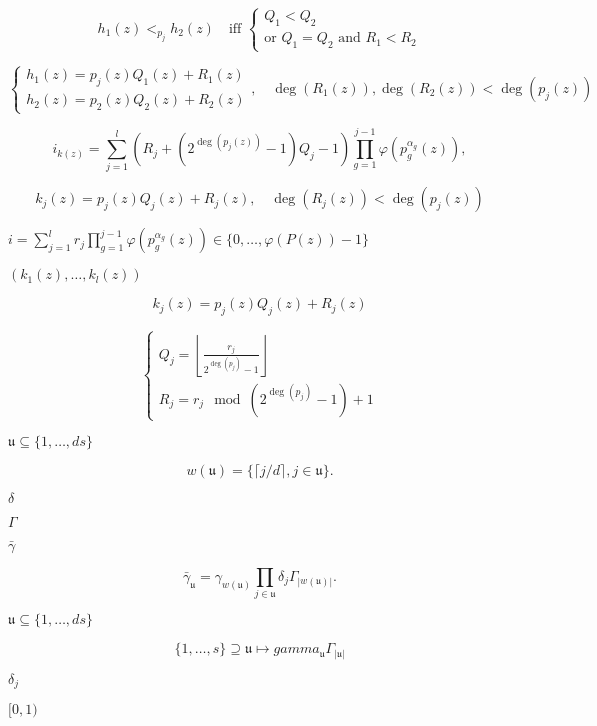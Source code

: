 \documentclass{article}
\begin{document}
\[h_{1}(z) <_{p_{j}}  h_{2}(z) \quad \text{iff } \left\{
\begin{array}{ll}
Q_1 < Q_2 \\
\text{or } Q_1 = Q_2 \text{ and } R_1 < R_2
\end{array}
\right.
\]
\pagebreak

\[\left\{
\begin{array}{ll}
h_{1}(z) = p_{j}(z) Q_{1}(z) + R_{1}(z) \\
h_{2}(z) = p_{2}(z) Q_{2}(z) + R_{2}(z)
\end{array}
\right., \quad \deg(R_{1}(z)),\deg(R_{2}(z)) < \deg(p_{j}(z))
\]
\pagebreak

\[  i_{k(z)} = \sum_{j=1}^{l} (R_{j} + (2^{\deg(p_j(z))}-1)Q_{j}-1) \prod_{g=1}^{j-1} \varphi(p_{g}^{\alpha_{g}}(z)),
\]
\pagebreak

\[  k_{j}(z) = p_{j}(z) Q_{j}(z) + R_{j}(z), \quad \deg(R_{j}(z)) < \deg(p_{j}(z))
\]
\pagebreak

$i = \sum_{j=1}^{l} r_{j} \prod_{g=1}^{j-1}\varphi(p_{g}^{\alpha_{g}}(z)) \in \{0,\dots, \varphi(P(z))-1\}$
\pagebreak

$(k_1(z),\dots,k_l(z))$
\pagebreak

\[  k_{j}(z) = p_j(z) Q_j(z) + R_j(z)
\]
\pagebreak

\[  \left\{
  \begin{array}{ll}
  Q_{j} = \left \lfloor \frac{r_{j}}{2^{\deg(p_{j})}-1} \right \rfloor\\
  R_{j} = r_{j} \mod (2^{\deg(p_{j})}-1) +1
  \end{array}
  \right.
\]
\pagebreak

$ \mathfrak u \subseteq \{1, \dots, ds\}$
\pagebreak

\[ w(\mathfrak u) = \{ \lceil j/d \rceil, j \in \mathfrak u\}.
\]
\pagebreak

$\delta$
\pagebreak

$\Gamma$
\pagebreak

$\bar{\gamma}$
\pagebreak

\[\bar{\gamma}_{\mathfrak u} = \gamma_{w(\mathfrak u)} \prod_{j \in \mathfrak u} \delta_j \Gamma_{|w(\mathfrak u)|}.
\]
\pagebreak

$ \mathfrak u \subseteq \{1, \dots, d s\} $
\pagebreak

\[ \{1, \dots, s \} \supseteq \mathfrak u \mapsto gamma_{\mathfrak u} \Gamma_{|\mathfrak u|}
\]
\pagebreak

$\delta_j$
\pagebreak

$[0,1)$
\pagebreak
\end{document}
